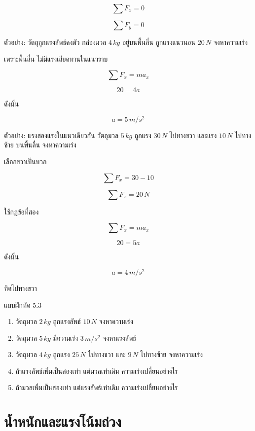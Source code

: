 \[
\sum F_x=0
\]

\[
\sum F_y=0
\]

\begin{examplebox}{ตัวอย่าง: วัตถุถูกแรงลัพธ์คงตัว}
กล่องมวล $4\,\si{kg}$ อยู่บนพื้นลื่น ถูกแรงแนวนอน $20\,\si{N}$ จงหาความเร่ง

เพราะพื้นลื่น ไม่มีแรงเสียดทานในแนวราบ

\[
\sum F_x=ma_x
\]

\[
20=4a
\]

ดังนั้น

\[
\boxed{a=5\,\si{m/s^2}}
\]
\end{examplebox}

\begin{examplebox}{ตัวอย่าง: แรงสองแรงในแนวเดียวกัน}
วัตถุมวล $5\,\si{kg}$ ถูกแรง $30\,\si{N}$ ไปทางขวา และแรง $10\,\si{N}$ ไปทางซ้าย บนพื้นลื่น จงหาความเร่ง

เลือกขวาเป็นบวก

\[
\sum F_x=30-10
\]

\[
\sum F_x=20\,\si{N}
\]

ใช้กฎข้อที่สอง

\[
\sum F_x=ma_x
\]

\[
20=5a
\]

ดังนั้น

\[
\boxed{a=4\,\si{m/s^2}}
\]

ทิศไปทางขวา
\end{examplebox}

\begin{exercisebox}{แบบฝึกหัด 5.3}
\begin{enumerate}
    \item วัตถุมวล $2\,\si{kg}$ ถูกแรงลัพธ์ $10\,\si{N}$ จงหาความเร่ง
    \item วัตถุมวล $5\,\si{kg}$ มีความเร่ง $3\,\si{m/s^2}$ จงหาแรงลัพธ์
    \item วัตถุมวล $4\,\si{kg}$ ถูกแรง $25\,\si{N}$ ไปทางขวา และ $9\,\si{N}$ ไปทางซ้าย จงหาความเร่ง
    \item ถ้าแรงลัพธ์เพิ่มเป็นสองเท่า แต่มวลเท่าเดิม ความเร่งเปลี่ยนอย่างไร
    \item ถ้ามวลเพิ่มเป็นสองเท่า แต่แรงลัพธ์เท่าเดิม ความเร่งเปลี่ยนอย่างไร
\end{enumerate}
\end{exercisebox}

\section{น้ำหนักและแรงโน้มถ่วง}

